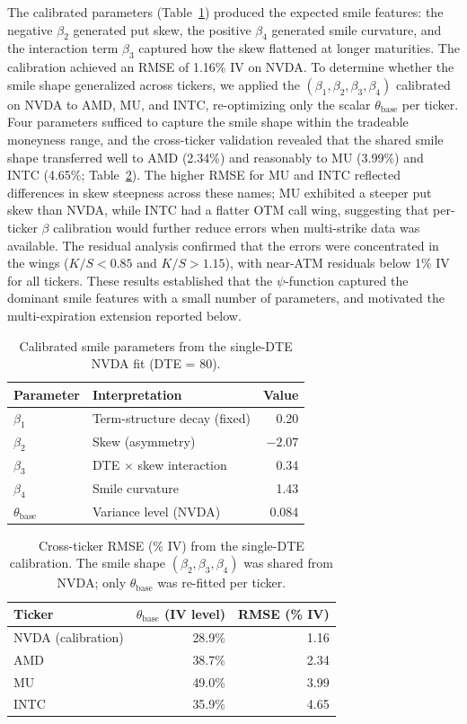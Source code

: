 The calibrated parameters (Table~\ref{tab:supp_params}) produced the expected smile features: the negative $\beta_2$ generated put skew, the positive $\beta_4$ generated smile curvature, and the interaction term $\beta_3$ captured how the skew flattened at longer maturities. The calibration achieved an RMSE of 1.16\% IV on NVDA. To determine whether the smile shape generalized across tickers, we applied the $(\beta_1, \beta_2, \beta_3, \beta_4)$ calibrated on NVDA to AMD, MU, and INTC, re-optimizing only the scalar $\theta_{\text{base}}$ per ticker. Four parameters sufficed to capture the smile shape within the tradeable moneyness range, and the cross-ticker validation revealed that the shared smile shape transferred well to AMD (2.34\%) and reasonably to MU (3.99\%) and INTC (4.65\%; Table~\ref{tab:supp_rmse}). The higher RMSE for MU and INTC reflected differences in skew steepness across these names; MU exhibited a steeper put skew than NVDA, while INTC had a flatter OTM call wing, suggesting that per-ticker $\beta$ calibration would further reduce errors when multi-strike data was available. The residual analysis confirmed that the errors were concentrated in the wings ($K/S < 0.85$ and $K/S > 1.15$), with near-ATM residuals below 1\% IV for all tickers. These results established that the $\psi$-function captured the dominant smile features with a small number of parameters, and motivated the multi-expiration extension reported below.

\begin{table}[ht]
\centering
\caption{Calibrated smile parameters from the single-DTE NVDA fit (DTE = 80).}\label{tab:supp_params}
\begin{tabular}{llr}
\toprule
Parameter & Interpretation & Value \\
\midrule
$\beta_1$ & Term-structure decay (fixed) & 0.20 \\
$\beta_2$ & Skew (asymmetry)             & $-2.07$ \\
$\beta_3$ & DTE $\times$ skew interaction & 0.34 \\
$\beta_4$ & Smile curvature              & 1.43 \\
$\theta_{\text{base}}$ & Variance level (NVDA) & 0.084 \\
\bottomrule
\end{tabular}
\end{table}

\begin{table}[ht]
\centering
\caption{Cross-ticker RMSE (\% IV) from the single-DTE calibration. The smile shape $(\beta_2, \beta_3, \beta_4)$ was shared from NVDA; only $\theta_{\text{base}}$ was re-fitted per ticker.}\label{tab:supp_rmse}
\begin{tabular}{lrr}
\toprule
Ticker & $\theta_{\text{base}}$ (IV level) & RMSE (\% IV) \\
\midrule
NVDA (calibration) & 28.9\% & 1.16 \\
AMD  & 38.7\% & 2.34 \\
MU   & 49.0\% & 3.99 \\
INTC & 35.9\% & 4.65 \\
\bottomrule
\end{tabular}
\end{table}

